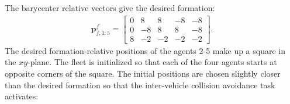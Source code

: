 The barycenter relative vectors give the desired formation:
\begin{equation}
    \begin{split}
    \mathbf{p}_{f,1:5}^f = \begin{bmatrix}
        0 & 8 & 8 & -8 & -8\\ 0 & -8 & 8 & 8 & -8 \\ 8 & -2& -2& -2& -2
    \end{bmatrix}.
    \end{split}
\end{equation}
The desired formation-relative positions of the agents 2-5 make up a square in the $xy$-plane. The fleet is initialized so that each of the four agents starts at opposite corners of the square. The initial positions are chosen slightly closer than the desired formation so that the inter-vehicle collision avoidance task activates:
